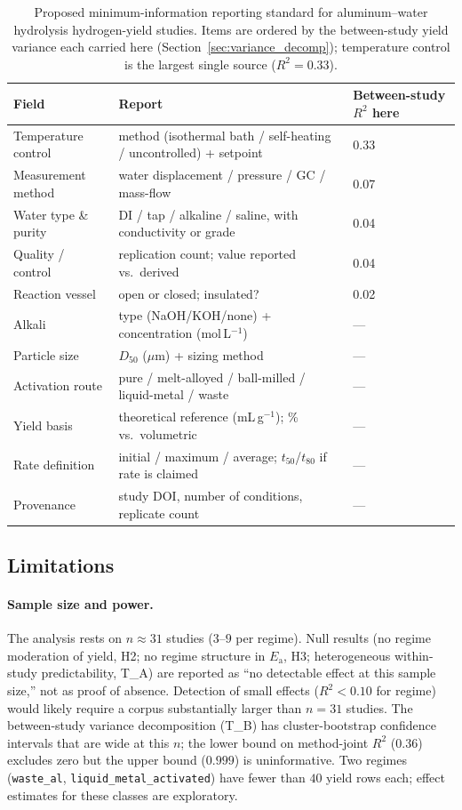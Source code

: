 \begin{table}[t]\centering\small
\caption{Proposed minimum-information reporting standard for aluminum--water hydrolysis
hydrogen-yield studies. Items are ordered by the between-study yield variance each
carried here (Section~\ref{sec:variance_decomp}); temperature control is the largest
single source ($R^2\!=\!0.33$).}
\label{tab:mireport}
\begin{tabular}{lll}
\toprule
Field & Report & Between-study $R^2$ here \\
\midrule
Temperature control  & method (isothermal bath / self-heating / uncontrolled) + setpoint & 0.33 \\
Measurement method   & water displacement / pressure / GC / mass-flow & 0.07 \\
Water type \& purity & DI / tap / alkaline / saline, with conductivity or grade & 0.04 \\
Quality / control    & replication count; value reported vs.\ derived & 0.04 \\
Reaction vessel      & open or closed; insulated? & 0.02 \\
Alkali               & type (NaOH/KOH/none) + concentration (mol\,L$^{-1}$) & --- \\
Particle size        & $D_{50}$ ($\mu$m) + sizing method & --- \\
Activation route     & pure / melt-alloyed / ball-milled / liquid-metal / waste & --- \\
Yield basis          & theoretical reference (mL\,g$^{-1}$); \% vs.\ volumetric & --- \\
Rate definition      & initial / maximum / average; $t_{50}$/$t_{80}$ if rate is claimed & --- \\
Provenance           & study DOI, number of conditions, replicate count & --- \\
\bottomrule
\end{tabular}
\end{table}

\subsection{Limitations}
\label{sec:limitations}

\paragraph{Sample size and power.}
The analysis rests on $n\!\approx\!31$ studies ($3$--$9$ per regime). Null results
(no regime moderation of yield, H2; no regime structure in $E_\mathrm{a}$, H3;
heterogeneous within-study predictability, T\_A) are reported as ``no detectable effect
at this sample size,'' not as proof of absence. Detection of small effects ($R^2\!<\!0.10$ for regime) would
likely require a corpus substantially larger than $n\!=\!31$ studies.
The between-study variance decomposition
(T\_B) has cluster-bootstrap confidence intervals that are wide at this $n$; the lower
bound on method-joint $R^2$ ($0.36$) excludes zero but the upper bound ($0.999$) is
uninformative. Two regimes (\texttt{waste\_al}, \texttt{liquid\_metal\_activated}) have
fewer than $40$ yield rows each; effect estimates for these classes are exploratory.

